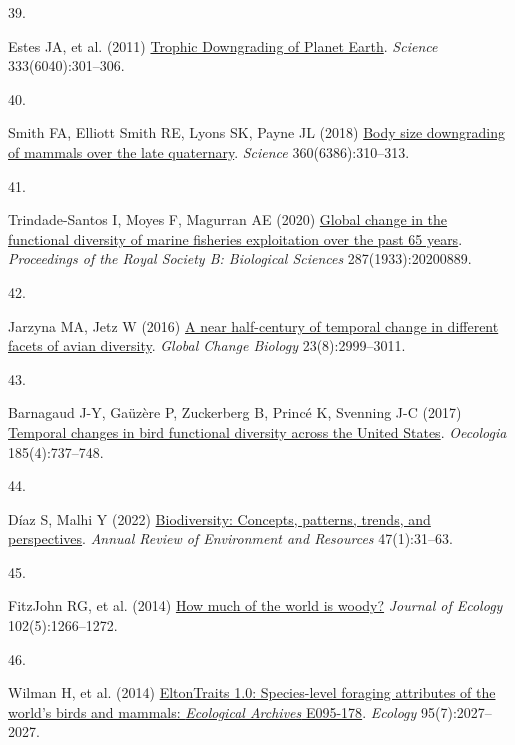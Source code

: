 \documentclass{article}
\newlength{\cslhangindent}
\newlength{\csllabelwidth}
\newlength{\cslentryspacingunit} %
\newenvironment{CSLReferences}[2] %
 {%
  \setlength{\parindent}{0pt}
  \ifodd #1
  \let\oldpar\par
  \def\par{\hangindent=\cslhangindent\oldpar}
  \fi
  \setlength{\parskip}{#2\cslentryspacingunit}
 }%
 {}
\newcommand{\CSLLeftMargin}[1]{\parbox[t]{\csllabelwidth}{#1}}
\newcommand{\CSLRightInline}[1]{\parbox[t]{\linewidth - \csllabelwidth}{#1}\break}
\begin{document}
\begin{CSLReferences}{0}{0}
\leavevmode{}%
\CSLLeftMargin{39. }%
\CSLRightInline{Estes JA, et al. (2011)
\href{https://doi.org/10.1126/science.1205106}{Trophic Downgrading of
Planet Earth}. \emph{Science} 333(6040):301--306.}

\leavevmode{}%
\CSLLeftMargin{40. }%
\CSLRightInline{Smith FA, Elliott Smith RE, Lyons SK, Payne JL (2018)
\href{https://doi.org/10.1126/science.aao5987}{Body size downgrading of
mammals over the late quaternary}. \emph{Science} 360(6386):310--313.}

\leavevmode{}%
\CSLLeftMargin{41. }%
\CSLRightInline{Trindade-Santos I, Moyes F, Magurran AE (2020)
\href{https://doi.org/10.1098/rspb.2020.0889}{Global change in the
functional diversity of marine fisheries exploitation over the past 65
years}. \emph{Proceedings of the Royal Society B: Biological Sciences}
287(1933):20200889.}

\leavevmode{}%
\CSLLeftMargin{42. }%
\CSLRightInline{Jarzyna MA, Jetz W (2016)
\href{https://doi.org/10.1111/gcb.13571}{A near half-century of temporal
change in different facets of avian diversity}. \emph{Global Change
Biology} 23(8):2999--3011.}

\leavevmode{}%
\CSLLeftMargin{43. }%
\CSLRightInline{Barnagaud J-Y, Gaüzère P, Zuckerberg B, Princé K,
Svenning J-C (2017)
\href{https://doi.org/10.1007/s00442-017-3967-4}{Temporal changes in
bird functional diversity across the United States}. \emph{Oecologia}
185(4):737--748.}

\leavevmode{}%
\CSLLeftMargin{44. }%
\CSLRightInline{Díaz S, Malhi Y (2022)
\href{https://doi.org/10.1146/annurev-environ-120120-054300}{Biodiversity:
Concepts, patterns, trends, and perspectives}. \emph{Annual Review of
Environment and Resources} 47(1):31--63.}

\leavevmode{}%
\CSLLeftMargin{45. }%
\CSLRightInline{FitzJohn RG, et al. (2014)
\href{https://doi.org/10.1111/1365-2745.12260}{How much of the world is
woody?} \emph{Journal of Ecology} 102(5):1266--1272.}

\leavevmode{}%
\CSLLeftMargin{46. }%
\CSLRightInline{Wilman H, et al. (2014)
\href{https://doi.org/10.1890/13-1917.1}{EltonTraits 1.0: Species-level
foraging attributes of the world's birds and mammals: {\emph{Ecological
Archives}} E095-178}. \emph{Ecology} 95(7):2027--2027.}


\end{CSLReferences}
\end{document}
